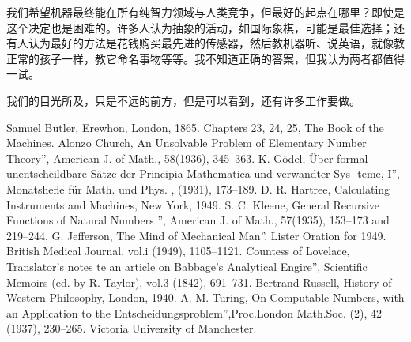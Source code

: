 \documentclass[12pt,a4paper,twoside]{article}
\begin{document}
我们希望机器最终能在所有纯智力领域与人类竞争，但最好的起点在哪里？即使是这个决定也是困难的。许多人认为抽象的活动，如国际象棋，可能是最佳选择；还有人认为最好的方法是花钱购买最先进的传感器，然后教机器听、说英语，就像教正常的孩子一样，教它命名事物等等。我不知道正确的答案，但我认为两者都值得一试。

我们的目光所及，只是不远的前方，但是可以看到，还有许多工作要做。


\begin{thebibliography}{99}
 Samuel Butler, Erewhon, London, 1865. Chapters 23, 24, 25, The Book of the Machines.
 Alonzo Church, An Unsolvable Problem of Elementary Number Theory”, American J. of Math., 58(1936), 345–363.
 K. Gödel, Über formal unentscheildbare Sätze der Principia Mathematica und verwandter Sys- teme, I”, Monatshefle für Math. und Phys. , (1931), 173–189.
 D. R. Hartree, Calculating Instruments and Machines, New York, 1949.
 S. C. Kleene, General Recursive Functions of Natural Numbers ”, American J. of Math., 57(1935), 153–173 and 219–244.
 G. Jefferson, The Mind of Mechanical Man”. Lister Oration for 1949. British Medical Journal, vol.i (1949), 1105–1121.
 Countess of Lovelace, Translator’s notes te an article on Babbage’s Analytical Engire”, Scientific Memoirs (ed. by R. Taylor), vol.3 (1842), 691–731.
 Bertrand Russell, History of Western Philosophy, London, 1940.
 A. M. Turing, On Computable Numbers, with an Application to the Entscheidungsproblem”,Proc.London Math.Soc. (2), 42 (1937), 230–265. Victoria University of Manchester.

\end{thebibliography}
\end{document}
